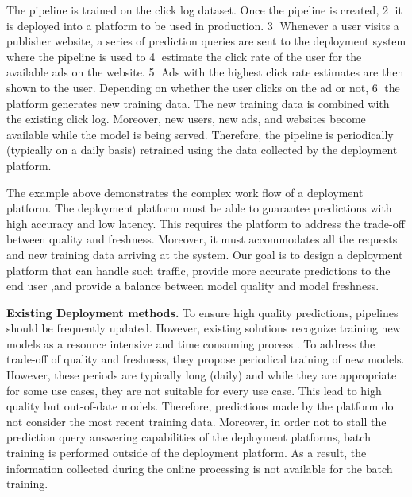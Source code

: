 The pipeline is trained on the click log dataset.
Once the pipeline is created, \textcircled{2} it is deployed into a platform to be used in production.
\textcircled{3} Whenever a user visits a publisher website, a series of prediction queries are sent to the deployment system where the pipeline is used to \textcircled{4} estimate the click rate of the user for the available ads on the website.
\textcircled{5} Ads with the highest click rate estimates are then shown to the user.
Depending on whether the user clicks on the ad or not, \textcircled{6} the platform generates new training data.
The new training data is combined with the existing click log.
Moreover, new users, new ads, and websites become available while the model is being served.
Therefore, the pipeline is periodically (typically on a daily basis) retrained using the data collected by the deployment platform.

The example above demonstrates the complex work flow of a deployment platform.
The deployment platform must be able to guarantee predictions with high accuracy and low latency.
This requires the platform to address the trade-off between quality and freshness.
Moreover, it must accommodates all the requests and new training data arriving at the system. 
Our goal is to design a deployment platform that can handle such traffic, provide more accurate predictions to the end user ,and provide a balance between model quality and model freshness.

\textbf{Existing Deployment methods.} 
To ensure high quality predictions, pipelines should be frequently updated.
However, existing solutions recognize training new models as a resource intensive and time consuming process \cite{crankshaw2014missing, agarwal2014laser, baylor2017tfx}.
To address the trade-off of quality and freshness, they propose periodical training of new models.
However, these periods are typically long (daily) and while they are appropriate for some use cases, they are not suitable for every use case.
This lead to high quality but out-of-date models.
Therefore, predictions made by the platform do not consider the most recent training data.
Moreover, in order not to stall the prediction query answering capabilities of the deployment platforms, batch training is performed outside of the deployment platform.
As a result, the information collected during the online processing is not available for the batch training. 

